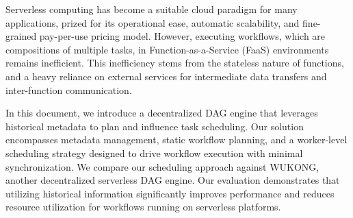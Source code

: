 \acresetall
\noindent Serverless computing has become a suitable cloud paradigm for many applications, prized for its operational ease, automatic scalability, and fine-grained pay-per-use pricing model. However, executing workflows, which are compositions of multiple tasks, in Function-as-a-Service (FaaS) environments remains inefficient. This inefficiency stems from the stateless nature of functions, and a heavy reliance on external services for intermediate data transfers and inter-function communication.

In this document, we introduce a decentralized DAG engine that leverages historical metadata to plan and influence task scheduling. Our solution encompasses metadata management, static workflow planning, and a worker-level scheduling strategy designed to drive workflow execution with minimal synchronization. We compare our scheduling approach against WUKONG, another decentralized serverless DAG engine. Our evaluation demonstrates that utilizing historical information significantly improves performance and reduces resource utilization for workflows running on serverless platforms.